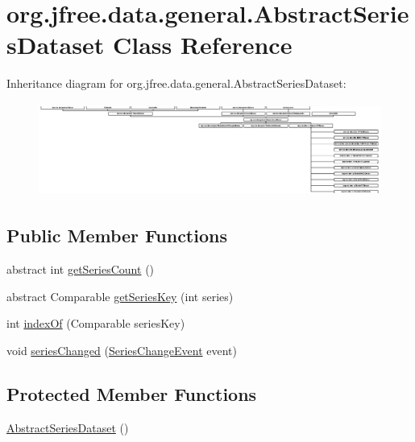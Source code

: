\hypertarget{classorg_1_1jfree_1_1data_1_1general_1_1_abstract_series_dataset}{}\section{org.\+jfree.\+data.\+general.\+Abstract\+Series\+Dataset Class Reference}
\label{classorg_1_1jfree_1_1data_1_1general_1_1_abstract_series_dataset}
Inheritance diagram for org.\+jfree.\+data.\+general.\+Abstract\+Series\+Dataset\+:\begin{figure}[H]
\begin{center}
\leavevmode
\includegraphics[height=3.079179cm]{classorg_1_1jfree_1_1data_1_1general_1_1_abstract_series_dataset}
\end{center}
\end{figure}
\subsection*{Public Member Functions}
\begin{DoxyCompactItemize}
\item 
abstract int \mbox{\hyperlink{classorg_1_1jfree_1_1data_1_1general_1_1_abstract_series_dataset_ae9bb05e02f26cb1243d7d1ccb8bae3c0}{get\+Series\+Count}} ()
\item 
abstract Comparable \mbox{\hyperlink{classorg_1_1jfree_1_1data_1_1general_1_1_abstract_series_dataset_afc45787d66065622852b5c4d6d4f422a}{get\+Series\+Key}} (int series)
\item 
int \mbox{\hyperlink{classorg_1_1jfree_1_1data_1_1general_1_1_abstract_series_dataset_a7ba00e324a49b6a0126c51b0a2c99abb}{index\+Of}} (Comparable series\+Key)
\item 
void \mbox{\hyperlink{classorg_1_1jfree_1_1data_1_1general_1_1_abstract_series_dataset_a675989ab4880ab0456aabb1eae97d832}{series\+Changed}} (\mbox{\hyperlink{classorg_1_1jfree_1_1data_1_1general_1_1_series_change_event}{Series\+Change\+Event}} event)
\end{DoxyCompactItemize}
\subsection*{Protected Member Functions}
\begin{DoxyCompactItemize}
\item 
\mbox{\hyperlink{classorg_1_1jfree_1_1data_1_1general_1_1_abstract_series_dataset_adf6b9cd33221841bb43742512deca232}{Abstract\+Series\+Dataset}} ()
\end{DoxyCompactItemize}


